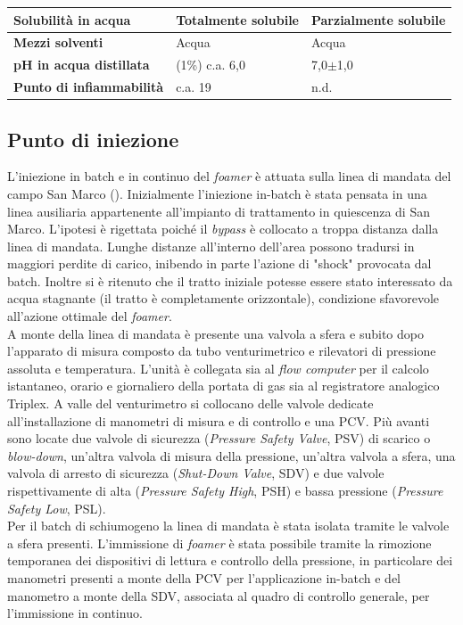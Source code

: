\begin{table}[htbp]
\begin{tabular}{|p{}|p{}p{}|}
\textbf{Solubilità in acqua}  & Totalmente solubile                           & Parzialmente solubile                         \\\hline
\textbf{Mezzi solventi  }               & Acqua                                         & Acqua                                         \\\hline
\textbf{pH in acqua distillata }        & (1\%) c.a. 6,0                                & 7,0\(\pm\)1,0                                     \\\hline
\textbf{Punto di infiammabilità   }     & c.a. 19                                       & n.d.                                         \\
\hline
\end{tabular}
\end{table}


\subsection{Punto di iniezione}
L'iniezione in batch e in continuo del \textit{foamer} è attuata sulla linea di mandata del campo San Marco (). Inizialmente l'iniezione in-batch è stata pensata in una linea ausiliaria appartenente all'impianto di trattamento in quiescenza di San Marco. L'ipotesi è rigettata poiché il \textit{bypass} è collocato a troppa distanza dalla linea di mandata. Lunghe distanze all'interno dell'area possono tradursi in maggiori perdite di carico, inibendo in parte l'azione di "shock" provocata dal batch. Inoltre si è ritenuto che il tratto iniziale potesse essere stato interessato da acqua stagnante (il tratto è completamente orizzontale), condizione sfavorevole all'azione ottimale del \textit{foamer}.\\
A monte della linea di mandata è presente una valvola a sfera e subito dopo l'apparato di misura composto da tubo venturimetrico e rilevatori di pressione assoluta e temperatura. L'unità è collegata sia al \textit{flow computer} per il calcolo istantaneo, orario e giornaliero della portata di gas sia al registratore analogico Triplex. A valle del venturimetro si collocano delle valvole dedicate all'installazione di manometri di misura e di controllo e una PCV. Più avanti sono locate due valvole di sicurezza (\textit{Pressure Safety Valve}, PSV) di scarico o \textit{blow-down}, un'altra valvola di misura della pressione, un'altra valvola a sfera, una valvola di arresto di sicurezza (\textit{Shut-Down Valve}, SDV) e due valvole rispettivamente di alta (\textit{Pressure Safety High}, PSH) e bassa pressione (\textit{Pressure Safety Low}, PSL).\\
Per il batch di schiumogeno la linea di mandata è stata isolata tramite le valvole a sfera presenti. L'immissione di \textit{foamer} è stata possibile tramite la rimozione temporanea dei dispositivi di lettura e controllo della pressione, in particolare dei manometri presenti a monte della PCV per l'applicazione in-batch e del manometro a monte della SDV, associata al quadro di controllo generale, per l'immissione in continuo.


